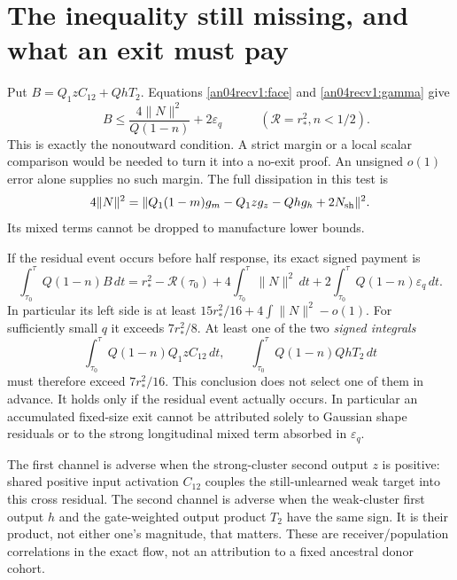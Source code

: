 \documentclass[11pt]{article}
\newcommand{\dd}{\,d}
\begin{document}
\section{The inequality still missing, and what an exit must pay}
Put $B=Q_1zC_{12}+QhT_2$. Equations
\eqref{an04recv1:face} and \eqref{an04recv1:gamma} give
\begin{equation}\label{an04recv1:missing}
 \boxed{\quad B\le\frac{4\|N\|^2}{Q(1-n)}+2\varepsilon_q\quad}
 \qquad(\mathcal R=r_*^2, n<1/2).
\end{equation}
This is exactly the nonoutward condition. A strict margin or a
local scalar comparison would be needed to turn it into a
no-exit proof. An unsigned $o(1)$ error alone supplies no such margin.
The full dissipation in this test is
\[
 4\|N\|^2=
 \|Q_1(1-m)g_m-Q_1z g_z-Qh g_h+2N_{\rm sh}\|^2.
\]
Its mixed terms cannot be dropped to manufacture lower bounds.

If the residual event occurs before half response, its exact signed
payment is
\begin{equation}\label{an04recv1:exit}
 \int_{\tau_0}^{\tau}Q(1-n)B\dd t
 =r_*^2-\mathcal R(\tau_0)+4\int_{\tau_0}^{\tau}\|N\|^2\dd t
     +2\int_{\tau_0}^{\tau}Q(1-n)\varepsilon_q\dd t.
\end{equation}
In particular its left side is at least
$15r_*^2/16+4\int\|N\|^2-o(1)$.
For sufficiently small $q$ it exceeds $7r_*^2/8$.
At least one of the two \emph{signed integrals}
\[
 \int_{\tau_0}^{\tau}Q(1-n)Q_1zC_{12}\dd t,\qquad
 \int_{\tau_0}^{\tau}Q(1-n)QhT_2\dd t
\]
must therefore exceed $7r_*^2/16$. This conclusion does not
select one of them in advance. It holds only if the residual
event actually occurs. In particular an accumulated fixed-size
exit cannot be attributed solely to Gaussian shape residuals or
to the strong longitudinal mixed term absorbed in $\varepsilon_q$.

The first channel is adverse when the strong-cluster second output
$z$ is positive: shared positive input activation $C_{12}$ couples
the still-unlearned weak target into this cross residual. The second
channel is adverse when the weak-cluster first output $h$ and the
gate-weighted output product $T_2$ have the same sign. It is their
product, not either one's magnitude, that matters. These are
receiver/population correlations in the exact flow, not an
attribution to a fixed ancestral donor cohort.
\end{document}
